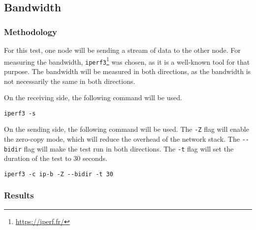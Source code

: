 \subsection{Bandwidth}

\subsubsection{Methodology}

For this test, one node will be sending a stream of data to the other node. For measuring the bandwidth, \verb|iperf3|\footnote{\url{https://iperf.fr/}} was chosen, as it is a well-known tool for that purpose. The bandwidth will be measured in both directions, as the bandwidth is not necessarily the same in both directions.

On the receiving side, the following command will be used.

\begin{verbatim}
iperf3 -s 
\end{verbatim}

On the sending side, the following command will be used.
The \verb|-Z| flag will enable the zero-copy mode, which will reduce the overhead of the network stack.
The \verb|--bidir| flag will make the test run in both directions.
The \verb|-t| flag will set the duration of the test to 30 seconds.

\begin{verbatim}
iperf3 -c ip-b -Z --bidir -t 30
\end{verbatim}

\subsubsection{Results}

